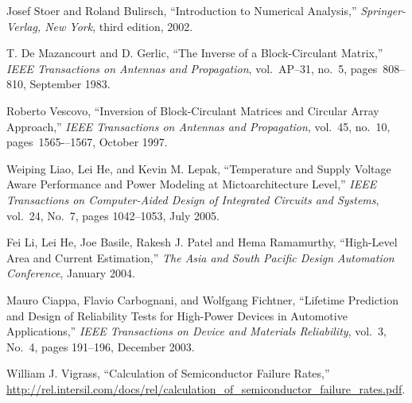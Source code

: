 \begin{thebibliography}{99}
    Josef Stoer and Roland Bulirsch,
    ``Introduction to Numerical Analysis,''
    \emph{Springer-Verlag, New York},
    third edition, 2002.

    T. De Mazancourt and D. Gerlic,
    ``The Inverse of a Block-Circulant Matrix,''
    \emph{IEEE Transactions on Antennas and Propagation},
    vol.~AP–31, no.~5, pages~808–810, September 1983.

    Roberto Vescovo,
    ``Inversion of Block-Circulant Matrices and Circular Array Approach,''
    \emph{IEEE Transactions on Antennas and Propagation},
    vol.~45, no.~10, pages~1565-–1567, October 1997.

    Weiping Liao, Lei He, and Kevin M. Lepak,
    ``Temperature and Supply Voltage Aware Performance and Power Modeling at Mictoarchitecture Level,''
    \emph{IEEE Transactions on Computer-Aided Design of Integrated Circuits and Systems},
    vol.~24, No.~7, pages 1042--1053, July 2005.

    Fei Li, Lei He, Joe Basile, Rakesh J. Patel and Hema Ramamurthy,
    ``High-Level Area and Current Estimation,''
    \emph{The Asia and South Pacific Design Automation Conference},
    January 2004.

    Mauro Ciappa, Flavio Carbognani, and Wolfgang Fichtner,
    ``Lifetime Prediction and Design of Reliability Tests for High-Power Devices in Automotive Applications,''
    \emph{IEEE Transactions on Device and Materials Reliability},
    vol.~3, No.~4, pages 191--196, December 2003.

    William J. Vigrass,
    ``Calculation of Semiconductor Failure Rates,''
    \url{http://rel.intersil.com/docs/rel/calculation_of_semiconductor_failure_rates.pdf}.
\end{thebibliography}
